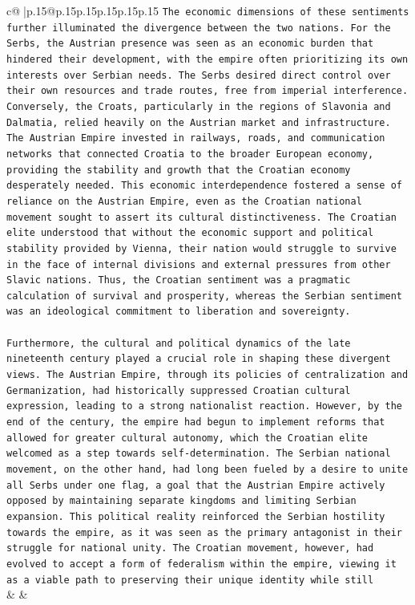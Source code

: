 \documentclass{article}
\begin{document}
{\begin{supertabular}{c@{$\;$}|p{.15\linewidth}@{}p{.15\linewidth}p{.15\linewidth}p{.15\linewidth}p{.15\linewidth}p{.15\linewidth}}
{{{\texttt{The economic dimensions of these sentiments further illuminated the divergence between the two nations. For the Serbs, the Austrian presence was seen as an economic burden that hindered their development, with the empire often prioritizing its own interests over Serbian needs. The Serbs desired direct control over their own resources and trade routes, free from imperial interference. Conversely, the Croats, particularly in the regions of Slavonia and Dalmatia, relied heavily on the Austrian market and infrastructure. The Austrian Empire invested in railways, roads, and communication networks that connected Croatia to the broader European economy, providing the stability and growth that the Croatian economy desperately needed. This economic interdependence fostered a sense of reliance on the Austrian Empire, even as the Croatian national movement sought to assert its cultural distinctiveness. The Croatian elite understood that without the economic support and political stability provided by Vienna, their nation would struggle to survive in the face of internal divisions and external pressures from other Slavic nations. Thus, the Croatian sentiment was a pragmatic calculation of survival and prosperity, whereas the Serbian sentiment was an ideological commitment to liberation and sovereignty.} \\
\\ 
\texttt{Furthermore, the cultural and political dynamics of the late nineteenth century played a crucial role in shaping these divergent views. The Austrian Empire, through its policies of centralization and Germanization, had historically suppressed Croatian cultural expression, leading to a strong nationalist reaction. However, by the end of the century, the empire had begun to implement reforms that allowed for greater cultural autonomy, which the Croatian elite welcomed as a step towards self{-}determination. The Serbian national movement, on the other hand, had long been fueled by a desire to unite all Serbs under one flag, a goal that the Austrian Empire actively opposed by maintaining separate kingdoms and limiting Serbian expansion. This political reality reinforced the Serbian hostility towards the empire, as it was seen as the primary antagonist in their struggle for national unity. The Croatian movement, however, had evolved to accept a form of federalism within the empire, viewing it as a viable path to preserving their unique identity while still} \\
            }
        }
    }
    & & \\ \\


\end{supertabular}}
\end{document}
